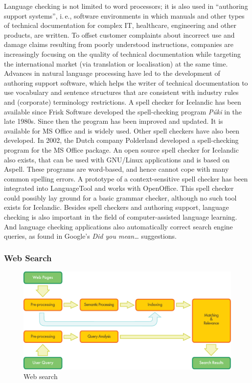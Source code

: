 \begin{multicols}{2}
Language checking is not limited to word processors; it is also used in “authoring support systems”, i.\,e., software environments in which manuals and other types of technical documentation for complex IT, healthcare, engineering and other products, are written. To offset customer complaints about incorrect use and damage claims resulting from poorly understood instructions, companies are increasingly focusing on the quality of technical documentation while targeting the international market (via translation or localisation) at the same time. Advances in natural language processing have led to the development of authoring support software, which helps the writer of technical documentation to use vocabulary and sentence structures that are consistent with industry rules and (corporate) terminology restrictions.
A spell checker for Icelandic has been available since Frisk Software developed the spell-checking program \textit{Púki} in the late 1980s. Since then the program has been improved and updated. It is available for MS Office and is widely used. Other spell checkers have also been developed. In 2002, the Dutch company Polderland developed a spell-checking program for the MS Office package. An open source spell checker for Icelandic also exists, that can be used with GNU/Linux applications and is based on Aspell. These programs are word-based, and hence cannot cope with many common spelling errors. A prototype of a context-sensitive spell checker has been integrated into LanguageTool \cite{lto1} and works with OpenOffice. This spell checker could possibly lay ground for a basic grammar checker, although no such tool exists for Icelandic.
Besides spell checkers and authoring support, language checking is also important in the field of computer-assisted language learning. And language checking applications also automatically correct search engine queries, as found in Google's \textit{Did you mean…} suggestions.

\subsubsection{Web Search}

\begin{figure}[htb]
  \center
  \includegraphics[width=\textwidth]{../_media/english/web_search_architecture}
  \caption{Web search}
  \label{fig:websearcharch_en}
 \end{figure}


\end{multicols}
